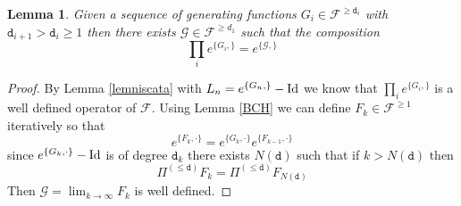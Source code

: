 \documentclass[reqno,11pt]{amsart}
\theoremstyle{plain}
\numberwithin{equation}{section}
\newtheorem{prop}[thm]{Proposition}
\newtheorem{lemma}[theorem]{Lemma}
\newcommand{\id}{{\rm Id}}
\newcommand{\cF}{{\mathcal F}}
\newcommand{\cM}{{\mathcal M}}
\newcommand{\cR}{{\mathcal R}}
\newcommand{\cK}{{\mathcal K}}
\newcommand{\cG}{{\mathcal G}}
\newcommand{\td}{{\mathtt{d}}}
\newcommand{\al}{{\alpha}}
\newcommand{\bt}{{\beta}}
\begin{document}
{%
\begin{lemma} \label{compo} Given a sequence of generating functions $G_i\in \cF^{{\geq} \td_i}$ with $\td_{i+1} > \td_i\geq 1$ then there exists $\cG\in \cF^{\geq d_1}$ such that the composition
	\[
	\prod_i	e^{\{G_i,\}} = e^{\{\cG,\}}
	\] 
\end{lemma}
\begin{proof} 
	By Lemma \ref{lemniscata} with $L_n = e^{\{G_n,\}}  -\id$ we know that  $\prod_i	e^{\{G_i,\}}$ is a well defined operator of $\cF$. 
	Using Lemma \ref{BCH} we can define $F_k\in \cF^{\geq1}$ iteratively so that
	\[
	e^{\{F_k,\cdot\}}= e^{\{G_k,\cdot\}} e^{\{F_{k-1},\cdot\}}
	\]
	since $e^{\{G_k,\cdot\}} -\id$ is of degree $\td_k$  there exists $N(\td)$ such that if $k>N(\td)$ then 
	\[
	\Pi^{(\leq  \td )}	F_k = \Pi^{(\leq  \td )}	F_{N(\td)}
	\]
	Then  $\cG= \lim_{k\to \infty} F_k$ is well defined.
\end{proof}
%	

}
\end{document}
